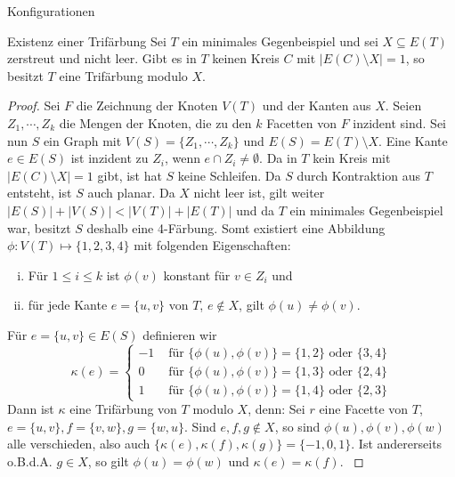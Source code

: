 \begin{section}{Konfigurationen}
 \begin{satz}{Existenz einer Trifärbung}
  Sei $T$ ein minimales Gegenbeispiel und sei $X\subseteq E(T)$ zerstreut und nicht leer. Gibt es in $T$ keinen Kreis $C$ mit $|E(C) \setminus X| = 1$, so besitzt $T$ eine Trifärbung modulo $X$.
 \end{satz}
 \begin{proof}
  Sei $F$ die Zeichnung der Knoten $V(T)$ und der Kanten aus $X$. Seien $Z_1,\cdots,Z_k$ die Mengen der Knoten, die zu den $k$ Facetten von $F$ inzident sind. Sei nun $S$ ein Graph mit $V(S) =\{Z_1,\cdots,Z_k\}$ und $E(S) = E(T) \setminus X$. Eine Kante $e \in E(S)$ ist inzident zu  $Z_i$, wenn $e \cap Z_i \neq \emptyset$. Da in $T$ kein Kreis mit $|E(C) \setminus X| = 1$ gibt, ist hat $S$ keine Schleifen. Da $S$ durch Kontraktion aus $T$ entsteht, ist $S$ auch planar. Da $X$ nicht leer ist, gilt weiter $|E(S)| + |V(S)| < |V(T)| + |E(T)|$ und da $T$ ein minimales Gegenbeispiel war, besitzt $S$ deshalb eine 4-Färbung. Somt existiert eine Abbildung $\phi: V(T) \mapsto \{1,2,3,4\}$ mit folgenden Eigenschaften:
  \begin{enumerate}[(i)]
   \item Für $1 \leq i \leq k$ ist $\phi(v)$ konstant für $v \in Z_i$ und
   \item für jede Kante $e=\{u,v\}$ von $T$, $e\not\in X$, gilt $\phi(u) \neq \phi(v)$.
  \end{enumerate}
  Für $e=\{u,v\} \in E(S)$ definieren wir\\
  \[\kappa(e) = \begin{cases}
                -1 &\text{ für } \{\phi(u), \phi(v)\} = \{1,2\}\text{ oder } \{3,4\}\\
                0  &\text{ für } \{\phi(u), \phi(v)\} = \{1,3\}\text{ oder } \{2,4\}\\
                1  &\text{ für } \{\phi(u), \phi(v)\} = \{1,4\}\text{ oder } \{2,3\}  
               \end{cases}\]
  Dann ist $\kappa$ eine Trifärbung von $T$ modulo $X$, denn: Sei $r$ eine Facette von $T$, $e=\{u,v\},f=\{v,w\},g=\{w,u\}$. Sind $e,f,g \not\in X$, so sind $\phi(u),\phi(v),\phi(w)$ alle verschieden, also auch $\{\kappa(e),\kappa(f),\kappa(g)\}=\{-1,0,1\}$. Ist andererseits o.B.d.A. $g\in X$, so gilt $\phi(u) = \phi(w)$ und $\kappa(e)=\kappa(f)$. \cite{FourRSST}
 \end{proof}
\end{section}